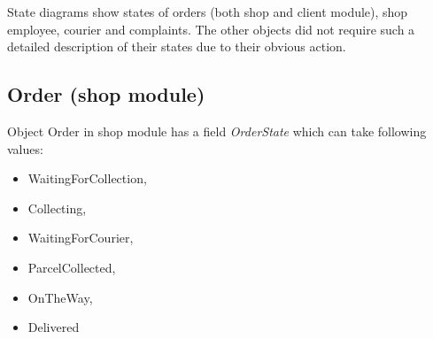 \documentclass[../main.tex]{subfiles}
\begin{document}
State diagrams show states of orders (both shop and client module), shop employee, courier
and complaints. The other objects did not require such a detailed description of their states due to their obvious action.

\subsection{Order (shop module)}
\vspace{5mm}

Object Order in shop module has a field \textit{OrderState} which can take following values:

\begin{itemize}
\item WaitingForCollection,
\item Collecting,
\item WaitingForCourier,
\item ParcelCollected,
\item OnTheWay,
\item Delivered
\end{itemize}
\end{document}
